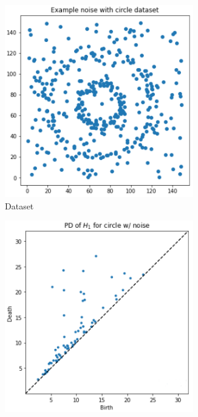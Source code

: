 \documentclass[../main.tex]{subfiles}
\begin{document}
\begin{itemize}
    \begin{figure}[!ht]
        \centering
    \begin{subfigure}[b]{0.33\textwidth}
         \centering
         \includegraphics[width=0.9\textwidth]{figures/bg/pers_img_1.png}
        \caption{Dataset}
         \label{fig:pers_img_1}
     \end{subfigure}\hfill
      \begin{subfigure}[b]{0.33\textwidth}
         \centering
         \includegraphics[width=0.9\textwidth]{figures/bg/pers_img_2.png}

\end{subfigure}
\end{figure}
\end{itemize}
\end{document}
